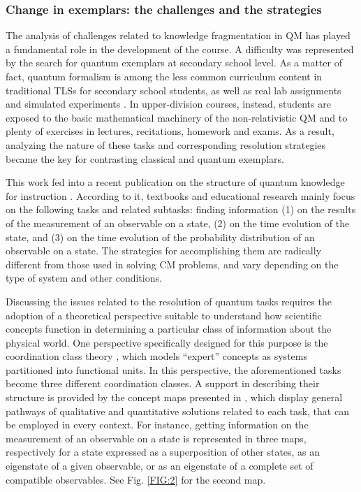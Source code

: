 \documentclass[twocolumn,secnumarabic,amssymb, nobibnotes, aps, prd, nofootinbib]{revtex4-2}
\begin{document}
\subsubsection{Change in exemplars: the challenges and the strategies} \label{Sec:2.1.2}
The analysis of challenges related to knowledge fragmentation in QM has played a fundamental role in the development of the course. A difficulty was represented by the search for quantum exemplars at secondary school level. As a matter of fact, quantum formalism is among the less common curriculum content in traditional TLSs for secondary school students, as well as real lab assignments and simulated experiments \cite{Stadermann2019}. In upper-division courses, instead, students are exposed to the basic mathematical machinery of the non-relativistic QM and to plenty of exercises in lectures, recitations, homework and exams. As a result, analyzing the nature of these tasks and corresponding resolution strategies became the key for contrasting classical and quantum exemplars.

This work fed into a recent publication on the structure of quantum knowledge for instruction \cite{Zuccarini2020}. According to it, textbooks and educational research mainly focus on the following tasks and related subtasks: finding information (1) on the results of the measurement of an observable on a state, (2) on the time evolution of the state, and (3) on the time evolution of the probability distribution of an observable on a state. The strategies for accomplishing them are radically different from those used in solving CM problems, and vary depending on the type of system and other conditions.

Discussing the issues related to the resolution of quantum tasks requires the adoption of a theoretical perspective suitable to understand how scientific concepts function in determining a particular class of information about the physical world. One perspective specifically designed for this purpose is the coordination class theory \cite{diSessa1998, diSessa2016}, which models “expert” concepts as systems partitioned into functional units. In this perspective, the aforementioned tasks become three different coordination classes. A support in describing their structure is provided by the concept maps presented in \cite{Zuccarini2020}, which display general pathways of qualitative and quantitative solutions related to each task, that can be employed in every context. For instance, getting information on the measurement of an observable on a state is represented in three maps, respectively for a state expressed as a superposition of other states, as an eigenstate of a given observable, or as an eigenstate of a complete set of compatible observables. See Fig. \ref{FIG:2} for the second map.
\begin{figure*}[!htpb]
    \centering
    \caption{Measurement on an eigenstate of an observable.}
    \label{FIG:2}
\end{figure*}
\end{document}

